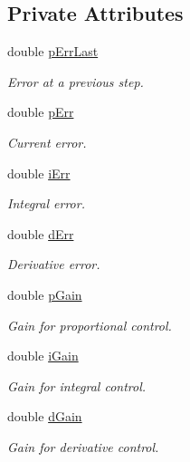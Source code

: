 \subsection*{Private Attributes}
\begin{DoxyCompactItemize}
\item 
double \hyperlink{classnubot_1_1PID_ab22052153953c1a8b5eee63ab415fa2a}{p\-Err\-Last}
\begin{DoxyCompactList}\small\item\em Error at a previous step. \end{DoxyCompactList}\item 
double \hyperlink{classnubot_1_1PID_a3b4084ff47368c23428b95c2fa6d78ee}{p\-Err}
\begin{DoxyCompactList}\small\item\em Current error. \end{DoxyCompactList}\item 
double \hyperlink{classnubot_1_1PID_abed7f1c0d6b47c154c5b8733d5c043ef}{i\-Err}
\begin{DoxyCompactList}\small\item\em Integral error. \end{DoxyCompactList}\item 
double \hyperlink{classnubot_1_1PID_aa8ebb6b2cec73c281d83ac6882739320}{d\-Err}
\begin{DoxyCompactList}\small\item\em Derivative error. \end{DoxyCompactList}\item 
double \hyperlink{classnubot_1_1PID_a515d0b570daa43350349e1b776860a58}{p\-Gain}
\begin{DoxyCompactList}\small\item\em Gain for proportional control. \end{DoxyCompactList}\item 
double \hyperlink{classnubot_1_1PID_ac7b246ff55dc55bf825432fa362af235}{i\-Gain}
\begin{DoxyCompactList}\small\item\em Gain for integral control. \end{DoxyCompactList}\item 
double \hyperlink{classnubot_1_1PID_a4e2f4ef996f5fd9628686b5111e3d0d3}{d\-Gain}
\begin{DoxyCompactList}\small\item\em Gain for derivative control. \end{DoxyCompactList}\item 

\end{DoxyCompactItemize}
